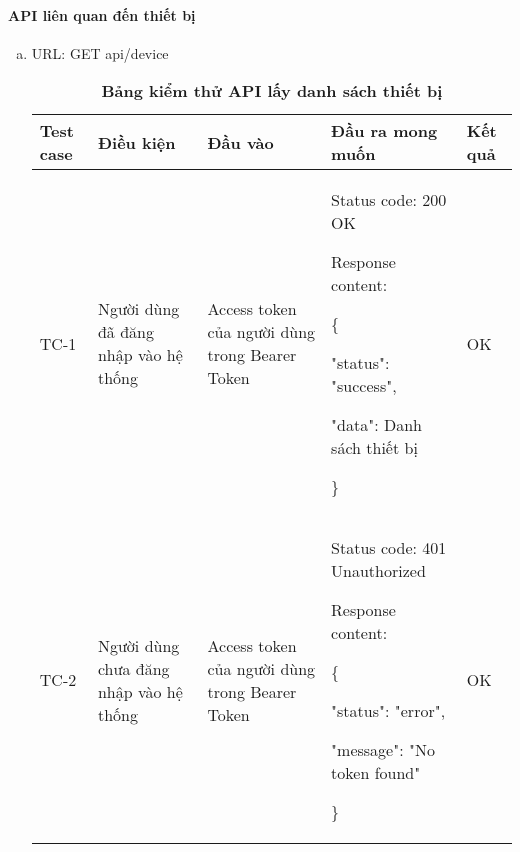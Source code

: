 \paragraph{API liên quan đến thiết bị}
\mbox{}


\begin{enumerate}[a)]
  \item URL: GET api/device
    
    \begin{xltabular}{\textwidth}{
      | >{\raggedright\arraybackslash}p{1cm}
      | >{\raggedright\arraybackslash}p{2.5cm}
      | >{\raggedright\arraybackslash}p{2.5cm}
      | >{\raggedright\arraybackslash}X
      | >{\raggedright\arraybackslash}p{1cm}|
      }
      \caption{\bfseries \fontsize{12pt}{0pt}\selectfont Bảng kiểm thử API lấy danh sách thiết bị}
      \\
      \hline
      \bfseries Test case    &\bfseries Điều kiện   &\bfseries Đầu vào 
      &\bfseries Đầu ra mong muốn &\bfseries Kết quả\\ \hline
    
    
      TC-1
      & Người dùng đã đăng nhập vào hệ thống
      & Access token của người dùng trong Bearer Token
    
      & 
    
      Status code: 200 OK
    
        Response content:
    
        \{
    
      "status": "success",
    
      "data": Danh sách thiết bị
    
      \}
      & OK
    
      \\ \hline
    
      TC-2
      & Người dùng chưa đăng nhập vào hệ thống
      & Access token của người dùng trong Bearer Token
    
      & 
    
      Status code: 401 Unauthorized
    
        Response content:
    
        \{
    
      "status": "error",
    
      "message": "No token found"
    
      \}
      & OK
      \\ \hline


\end{xltabular}
\end{enumerate}

